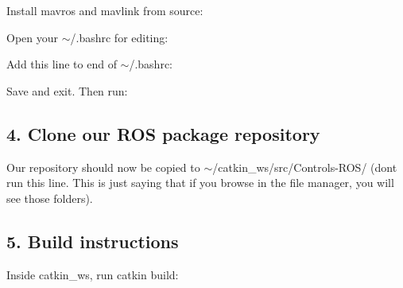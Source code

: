 Install {\ttfamily mavros} and {\ttfamily mavlink} from source\+: 
\begin{DoxyCode}{0}
\DoxyCodeLine{}
\DoxyCodeLine{}
\end{DoxyCode}


Open your {\ttfamily $\sim$/.bashrc} for editing\+: 
\begin{DoxyCode}{0}
\end{DoxyCode}


Add this line to end of {\ttfamily $\sim$/.bashrc}\+: 
\begin{DoxyCode}{0}
\end{DoxyCode}
 Save and exit. Then run\+: 
\begin{DoxyCode}{0}
\end{DoxyCode}


\subsection*{4. Clone our R\+OS package repository}


\begin{DoxyCode}{0}
\end{DoxyCode}
 Our repository should now be copied to {\ttfamily $\sim$/catkin\+\_\+ws/src/\+Controls-\/\+R\+O\+S/} (don\textquotesingle{}t run this line. This is just saying that if you browse in the file manager, you will see those folders).

\subsection*{5. Build instructions}

Inside {\ttfamily catkin\+\_\+ws}, run {\ttfamily catkin build}\+:


\begin{DoxyCode}{0}
\end{DoxyCode}


